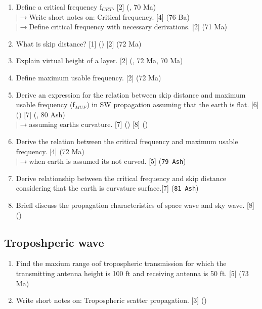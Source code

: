 \documentclass[12pt]{article}
\newcommand{\lb}{\\$\left|\rightarrow\right.$}
\begin{document}
\begin{enumerate}
      \item Define a critical frequency f$_{CRT}$. \hfill [2] (, 70 Ma)
        \lb Write short notes on: Critical frequency. \hfill [4] (76 Ba)
        \lb Define critical frequency with necessary derivations. \hfill [2] (71 Ma)

      \item What is skip distance? \hfill [1] () [2] (72 Ma)

      \item Explain virtual height of a layer. \hfill [2] (, 72 Ma, 70 Ma)

      \item Define maximum usable frequency. \hfill [2] (72 Ma)

      \item Derive an expression for the relation between skip distance and maximum usable frequency (f$_{MUF}$) in SW propagation assuming that the earth is flat. \hfill [6] () [7] (, 80 Ash)
        \lb assuming earths curvature. \hfill [7] () [8] ()
      
      \item Derive the relation between the critical frequency and maximum usable frequency. \hfill [4] (72 Ma)
        \lb when earth is assumed its not curved. \hfill [5] (\texttt{79 Ash})

      \item Derive relationship between the critical frequency and skip distance considering that the earth is curvature surface.\hfill [7] (\texttt{81 Ash})

      \item Briefl discuss the propagation characteristics of space wave and sky wave. \hfill [8] ()
    \end{enumerate}

  \subsection{Troposhperic wave}
    \begin{enumerate}
      \item Find the maxium range oof tropospheric transmission for which the transmitting antenna height is 100 ft and receiving antenna is 50 ft. \hfill [5] (73 Ma)

      \item Write short notes on: Tropospheric scatter propagation. \hfill [3] ()
    \end{enumerate}
\end{document}
